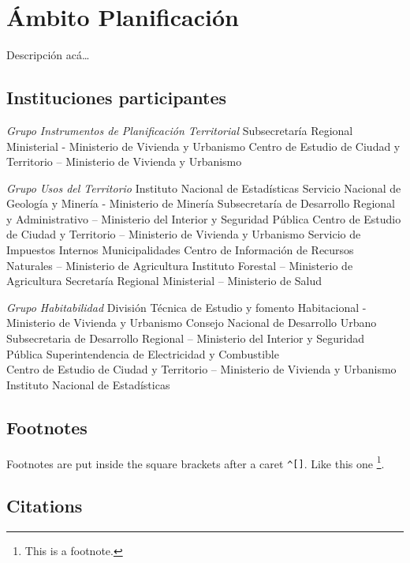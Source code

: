 \documentclass[
]{book}
\theoremstyle{definition}
\theoremstyle{definition}
\theoremstyle{definition}
\theoremstyle{definition}
\theoremstyle{remark}
\begin{document}
\hypertarget{uxe1mbito-planificaciuxf3n}{%
\chapter{Ámbito Planificación}\label{uxe1mbito-planificaciuxf3n}}

Descripción acá\ldots{}

\hypertarget{instituciones-participantes-3}{%
\section*{Instituciones participantes}\label{instituciones-participantes-3}}

\emph{Grupo Instrumentos de Planificación Territorial}
Subsecretaría Regional Ministerial - Ministerio de Vivienda y Urbanismo
Centro de Estudio de Ciudad y Territorio -- Ministerio de Vivienda y Urbanismo

\emph{Grupo Usos del Territorio}
Instituto Nacional de Estadísticas
Servicio Nacional de Geología y Minería - Ministerio de Minería
Subsecretaría de Desarrollo Regional y Administrativo -- Ministerio del Interior y Seguridad Pública
Centro de Estudio de Ciudad y Territorio -- Ministerio de Vivienda y Urbanismo
Servicio de Impuestos Internos
Municipalidades
Centro de Información de Recursos Naturales -- Ministerio de Agricultura
Instituto Forestal -- Ministerio de Agricultura
Secretaría Regional Ministerial -- Ministerio de Salud

\emph{Grupo Habitabilidad}
División Técnica de Estudio y fomento Habitacional - Ministerio de Vivienda y Urbanismo
Consejo Nacional de Desarrollo Urbano
Subsecretaria de Desarrollo Regional -- Ministerio del Interior y Seguridad Pública
Superintendencia de Electricidad y Combustible\\
Centro de Estudio de Ciudad y Territorio -- Ministerio de Vivienda y Urbanismo
Instituto Nacional de Estadísticas

\hypertarget{footnotes}{%
\section*{Footnotes}\label{footnotes}}

Footnotes are put inside the square brackets after a caret \texttt{\^{}{[}{]}}. Like this one \footnote{This is a footnote.}.

\hypertarget{citations}{%
\section*{Citations}\label{citations}}
\end{document}

